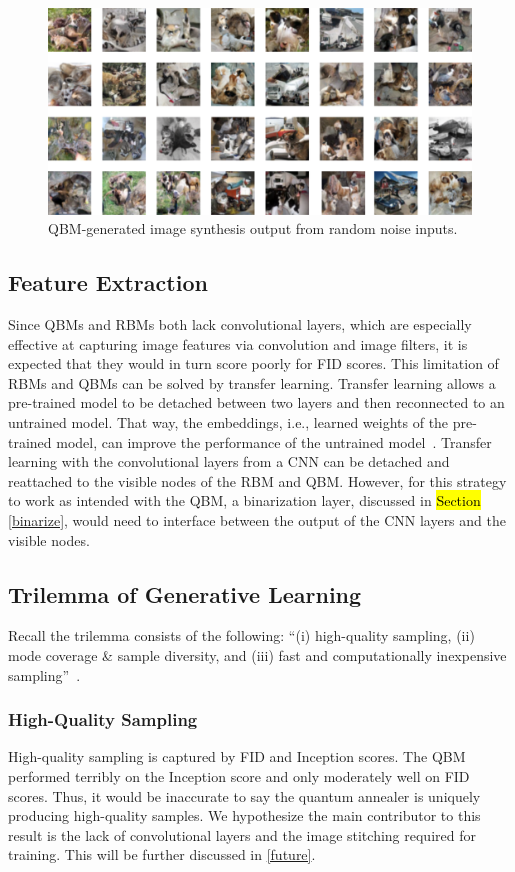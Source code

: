 \documentclass[technologies,article,accept,pdftex,moreauthors]{Definitions/mdpi}
\begin{document}
\begin{figure}[H]
    \includegraphics[width=.99\columnwidth]{qbmout.png}
    \caption{\label{fig:qbmresults}QBM-generated image synthesis output from random noise inputs.}
\end{figure}

\subsection{Feature Extraction}
Since QBMs and RBMs both lack convolutional layers, which are especially effective at capturing image features via convolution and image filters, it is expected that they would in turn score poorly for FID scores. This limitation of RBMs and QBMs can be solved by transfer learning. Transfer learning allows a pre-trained model to be detached between two layers and then reconnected to an untrained model. That way, the embeddings, i.e., learned weights of the pre-trained model, can improve the performance of the untrained model~\cite{transfer}. Transfer learning with the convolutional layers from a CNN can be detached and reattached to the visible nodes of the RBM and QBM. However, for this strategy to work as intended with the QBM, a binarization layer, discussed in \hl{Section} \ref{binarize},  would need to interface between the output of the CNN layers and the visible nodes.


\subsection{Trilemma of Generative Learning}
Recall the trilemma consists of the following: ``(i) high-quality sampling, (ii) mode coverage \& sample diversity, and (iii) fast and computationally inexpensive sampling''~\cite{xiao2022DDGAN}.

\subsubsection{High-Quality Sampling}
High-quality sampling is captured by FID and Inception scores. The QBM performed terribly on the Inception score and only moderately well on FID scores. Thus, it would be inaccurate to say the quantum annealer is uniquely producing high-quality samples. We hypothesize the main contributor to this result is the lack of convolutional layers and the image stitching required for training. This will be further discussed in \ref{future}.
\end{document}
